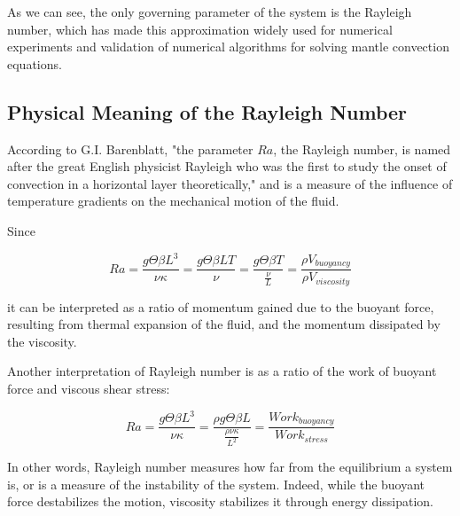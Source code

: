 \documentclass[
10pt, %
a4paper, %
oneside, %
headinclude,footinclude, %
BCOR5mm, %
]{scrartcl}
\begin{document}
As we can see, the only governing parameter of the system is the Rayleigh number, which has made this approximation widely used for numerical experiments and validation of numerical algorithms for solving mantle convection equations.

\subsection{Physical Meaning of the Rayleigh Number}

According to G.I. Barenblatt, "the parameter $Ra$, the Rayleigh number, is named after the great English physicist Rayleigh who was the first to study the onset of convection in a horizontal layer theoretically," \cite[p. 47]{barenblatt1} and is a measure of the influence of temperature gradients on the mechanical motion of the fluid. 

Since

$$ Ra = \frac{g\Theta \beta L^3}{\nu\kappa} = \frac{g\Theta \beta L T}{\nu} = \frac{g\Theta \beta T}{\frac{\nu}{L}} = \frac{\rho V_{buoyancy}}{\rho V_{viscosity}} $$

it can be interpreted as a ratio of momentum gained due to the buoyant force, resulting from thermal expansion of the fluid, and the momentum dissipated by the viscosity. 

Another interpretation of Rayleigh number is as a ratio of the work of buoyant force and viscous shear stress:

$$ Ra = \frac{g\Theta \beta L^3}{\nu\kappa} = \frac{\rho g\Theta \beta L}{\frac{\rho \nu \kappa}{L^2}} = \frac{Work_{buoyancy}}{Work_{stress}} $$

In other words, Rayleigh number measures how far from the equilibrium a system is, or is a measure of the instability of the system. Indeed, while the buoyant force destabilizes the motion, viscosity stabilizes it through energy dissipation.




\end{document}

